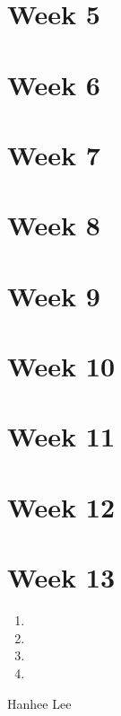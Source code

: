 \documentclass{article}
\begin{document}
    \section{Week 5}

    \section{Week 6}

    \section{Week 7}

    \section{Week 8}

    \section{Week 9}

    \section{Week 10}

    \section{Week 11}

    \section{Week 12}

    \section{Week 13}

\begin{process}
    \begin{enumerate}
        \item 
        \item 
        \item 
        \item 
    \end{enumerate}
\end{process}

\begin{example}
    Hanhee Lee
\end{example}
\end{document}
